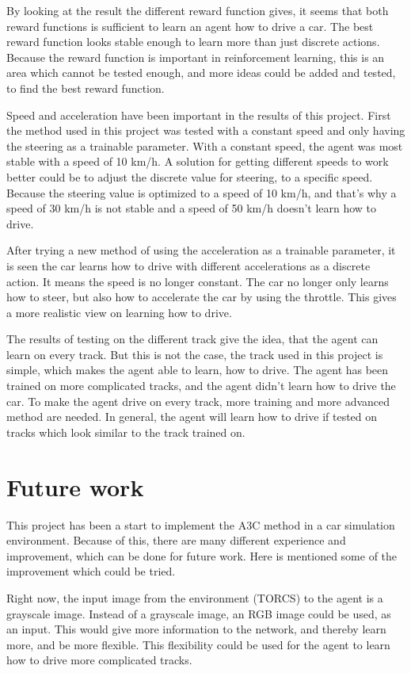 By looking at the result the different reward function gives, it seems that both reward functions is sufficient to learn an agent how to drive a car. The best reward function looks stable enough to learn more than just discrete actions. Because the reward function is important in reinforcement learning, this is an area which cannot be tested enough, and more ideas could be added and tested, to find the best reward function. 

Speed and acceleration have been important in the results of this project. First the method used in this project was tested with a constant speed and only having the steering as a trainable parameter. With a constant speed, the agent was most stable with a speed of 10 km/h. A solution for getting different speeds to work better could be to adjust the discrete value for steering, to a specific speed. Because the steering value is optimized to a speed of 10 km/h, and that’s why a speed of 30 km/h is not stable and a speed of 50 km/h doesn't learn how to drive. 

After trying a new method of using the acceleration as a trainable parameter, it is seen the car learns how to drive with different accelerations as a discrete action. It means the speed is no longer constant. The car no longer only learns how to steer, but also how to accelerate the car by using the throttle. This gives a more realistic view on learning how to drive.  

The results of testing on the different track give the idea, that the agent can learn on every track. But this is not the case, the track used in this project is simple, which makes the agent able to learn, how to drive. The agent has been trained on more complicated tracks, and the agent didn't learn how to drive the car. To make the agent drive on every track, more training and more advanced method are needed. In general, the agent will learn how to drive if tested on tracks which look similar to the track trained on. 

\section{Future work}
This project has been a start to implement the A3C method in a car simulation environment. Because of this, there are many different experience and improvement, which can be done for future work. Here is mentioned some of the improvement which could be tried.  

Right now, the input image from the environment (TORCS) to the agent is a grayscale image. Instead of a grayscale image, an RGB image could be used, as an input. This would give more information to the network, and thereby learn more, and be more flexible. This flexibility could be used for the agent to learn how to drive more complicated tracks.  

